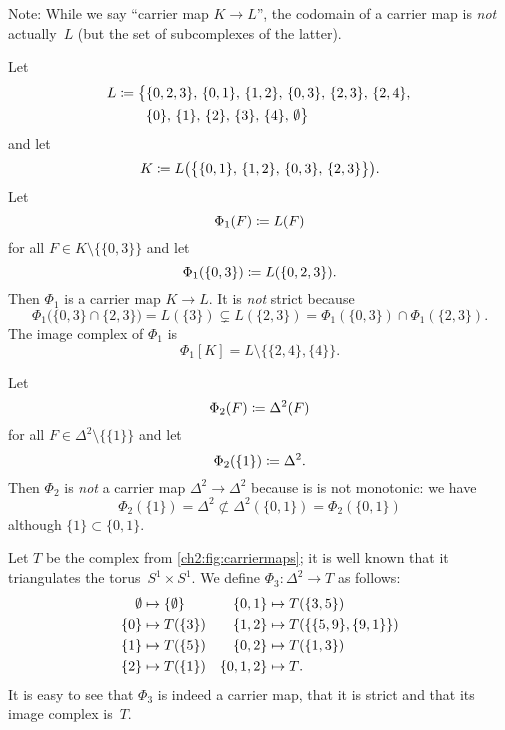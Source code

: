 Note: While we say \enquote{carrier map $K\to L$}, the codomain of a carrier map
is \emph{not} actually~$L$ (but the set of subcomplexes of the latter).

\begin{ExampleList}
    \item
        Let
        \begin{align*}
            L \coloneqq \bigl\{ &\{0,2,3\},\,
                \{0,1\},\, \{1,2\},\, \{0,3\},\, \{2,3\},\, \{2,4\},\,
                \\
                &\{0\},\, \{1\},\, \{2\},\, \{3\},\, \{4\},\,
                \emptyset
            \bigr\}
        \end{align*}
        and let
        \[ K \coloneqq L\bigl(\bigl\{ \{0,1\},\, \{1,2\},\, \{0,3\},\, \{2,3\}
                \bigr\}\bigr)
        . \]
        Let
        \[ \Phi_1(F) \coloneqq L(F) \]
        for all $F\in K\setminus\bigl\{ \{0,3\} \bigr\}$ and let
        \[ \Phi_1(\{0,3\}) \coloneqq L(\{0,2,3\}) . \]
        Then $\Phi_1$ is a carrier map $K\to L$. It is \emph{not} strict
        because
        \[ \Phi_1\bigl(\{0,3\} \cap \{2,3\}\bigr) = L(\{3\}) 
            \subsetneq L(\{2,3\}) = \Phi_1(\{0,3\}) \cap \Phi_1(\{2,3\})
        . \]
        The image complex of $\Phi_1$ is
        \[ \Phi_1[K] = L \setminus \bigl\{ \{2,4\}, \{4\} \bigr\}  . \]
        
    \item
        Let
        \[ \Phi_2(F) \coloneqq \Delta^2(F) \]
        for all $F\in\Delta^2\setminus\bigl\{\{1\}\bigr\}$ and let
        \[ \Phi_2(\{1\}) \coloneqq \Delta^2 . \]
        Then $\Phi_2$ is \emph{not} a carrier map $\Delta^2\to\Delta^2$
        because is is not monotonic: we have
        \[ \Phi_2(\{1\}) = \Delta^2
            \not\subset \Delta^2(\{0,1\}) = \Phi_2(\{0,1\}) \]
        although $\{1\} \subset \{0,1\}$.
        
    \item\label{ch2:ex:carriermaps:lat}
        Let $T$ be the complex from \cref{ch2:fig:carriermaps};
        it is well known that it triangulates the torus~$S^1\times S^1$.
        We define $\Phi_3\colon\Delta^2\to T$ as follows:
        \begin{align*}
              \emptyset &\mapsto \{\emptyset\}
            & \{0,1\} &\mapsto T(\{3,5\})
              \\
              \{0\}   &\mapsto T(\{3\})
            & \{1,2\} &\mapsto T(\{\{5,9\}, \{9,1\}\})
              \\
              \{1\}   &\mapsto T(\{5\})
            & \{0,2\} &\mapsto T(\{1,3\})
              \\
              \{2\}   &\mapsto T(\{1\})
            & \{0,1,2\} &\mapsto T
        \rlap{.}
        \end{align*}
        It is easy to see that $\Phi_3$ is indeed a carrier map,
        that it is strict and that its image complex is~$T$.
\end{ExampleList}

